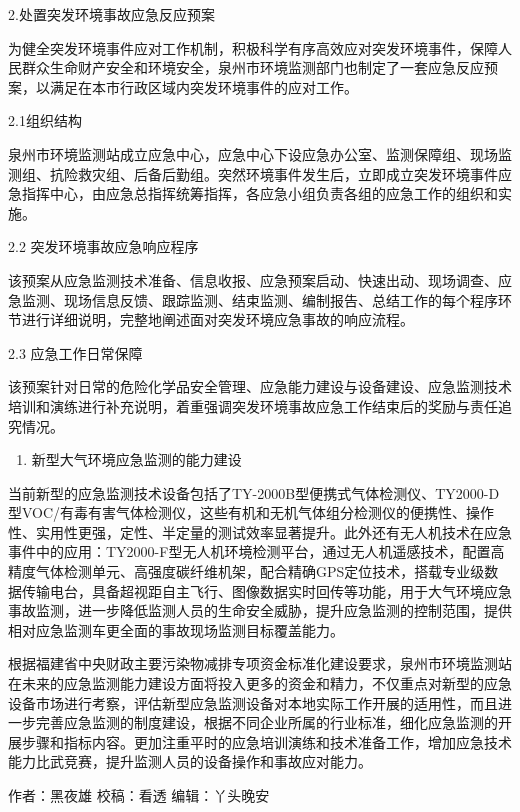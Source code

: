 \documentclass[]{book}
\providecommand{\tightlist}{%
  \setlength{\itemsep}{0pt}\setlength{\parskip}{0pt}}
\begin{document}
2.处置突发环境事故应急反应预案

为健全突发环境事件应对工作机制，积极科学有序高效应对突发环境事件，保障人民群众生命财产安全和环境安全，泉州市环境监测部门也制定了一套应急反应预案，以满足在本市行政区域内突发环境事件的应对工作。

2.1组织结构

泉州市环境监测站成立应急中心，应急中心下设应急办公室、监测保障组、现场监测组、抗险救灾组、后备后勤组。突然环境事件发生后，立即成立突发环境事件应急指挥中心，由应急总指挥统筹指挥，各应急小组负责各组的应急工作的组织和实施。

2.2 突发环境事故应急响应程序

该预案从应急监测技术准备、信息收报、应急预案启动、快速出动、现场调查、应急监测、现场信息反馈、跟踪监测、结束监测、编制报告、总结工作的每个程序环节进行详细说明，完整地阐述面对突发环境应急事故的响应流程。

2.3 应急工作日常保障

该预案针对日常的危险化学品安全管理、应急能力建设与设备建设、应急监测技术培训和演练进行补充说明，着重强调突发环境事故应急工作结束后的奖励与责任追究情况。

\begin{enumerate}
\def\labelenumi{\arabic{enumi}.}
\setcounter{enumi}{2}
\tightlist
\item
  新型大气环境应急监测的能力建设
\end{enumerate}

当前新型的应急监测技术设备包括了TY-2000B型便携式气体检测仪、TY2000-D型VOC/有毒有害气体检测仪，这些有机和无机气体组分检测仪的便携性、操作性、实用性更强，定性、半定量的测试效率显著提升。此外还有无人机技术在应急事件中的应用：TY2000-F型无人机环境检测平台，通过无人机遥感技术，配置高精度气体检测单元、高强度碳纤维机架，配合精确GPS定位技术，搭载专业级数据传输电台，具备超视距自主飞行、图像数据实时回传等功能，用于大气环境应急事故监测，进一步降低监测人员的生命安全威胁，提升应急监测的控制范围，提供相对应急监测车更全面的事故现场监测目标覆盖能力。

根据福建省中央财政主要污染物减排专项资金标准化建设要求，泉州市环境监测站在未来的应急监测能力建设方面将投入更多的资金和精力，不仅重点对新型的应急设备市场进行考察，评估新型应急监测设备对本地实际工作开展的适用性，而且进一步完善应急监测的制度建设，根据不同企业所属的行业标准，细化应急监测的开展步骤和指标内容。更加注重平时的应急培训演练和技术准备工作，增加应急技术能力比武竞赛，提升监测人员的设备操作和事故应对能力。

作者：黑夜雄
校稿：看透
编辑：丫头晚安
\end{document}
